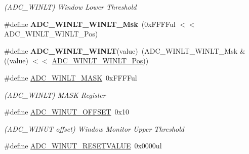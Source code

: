 \begin{DoxyCompactItemize}
\begin{DoxyCompactList}\small\item\em (A\+D\+C\+\_\+\+W\+I\+N\+L\+T) Window Lower Threshold \end{DoxyCompactList}\item 
\hypertarget{group___s_a_m_l21___a_d_c_ga29c9d6e11a88066dbbb16527919a90c1}{}\#define {\bfseries A\+D\+C\+\_\+\+W\+I\+N\+L\+T\+\_\+\+W\+I\+N\+L\+T\+\_\+\+Msk}~(0x\+F\+F\+F\+Ful $<$$<$ A\+D\+C\+\_\+\+W\+I\+N\+L\+T\+\_\+\+W\+I\+N\+L\+T\+\_\+\+Pos)\label{group___s_a_m_l21___a_d_c_ga29c9d6e11a88066dbbb16527919a90c1}

\item 
\hypertarget{group___s_a_m_l21___a_d_c_ga428dbb684b20bfb0502551074b1c7f6e}{}\#define {\bfseries A\+D\+C\+\_\+\+W\+I\+N\+L\+T\+\_\+\+W\+I\+N\+L\+T}(value)~(A\+D\+C\+\_\+\+W\+I\+N\+L\+T\+\_\+\+W\+I\+N\+L\+T\+\_\+\+Msk \& ((value) $<$$<$ \hyperlink{group___s_a_m_l21___a_d_c_ga8d8679254a2a5ba70a7378316be2b2e2}{A\+D\+C\+\_\+\+W\+I\+N\+L\+T\+\_\+\+W\+I\+N\+L\+T\+\_\+\+Pos}))\label{group___s_a_m_l21___a_d_c_ga428dbb684b20bfb0502551074b1c7f6e}

\item 
\hypertarget{group___s_a_m_l21___a_d_c_gabb4377b4ea319484fcd2305d2fe98641}{}\#define \hyperlink{group___s_a_m_l21___a_d_c_gabb4377b4ea319484fcd2305d2fe98641}{A\+D\+C\+\_\+\+W\+I\+N\+L\+T\+\_\+\+M\+A\+S\+K}~0x\+F\+F\+F\+Ful\label{group___s_a_m_l21___a_d_c_gabb4377b4ea319484fcd2305d2fe98641}

\begin{DoxyCompactList}\small\item\em (A\+D\+C\+\_\+\+W\+I\+N\+L\+T) M\+A\+S\+K Register \end{DoxyCompactList}\item 
\hypertarget{group___s_a_m_l21___a_d_c_gacd3f5a80c82eef920b9ebb22f630d852}{}\#define \hyperlink{group___s_a_m_l21___a_d_c_gacd3f5a80c82eef920b9ebb22f630d852}{A\+D\+C\+\_\+\+W\+I\+N\+U\+T\+\_\+\+O\+F\+F\+S\+E\+T}~0x10\label{group___s_a_m_l21___a_d_c_gacd3f5a80c82eef920b9ebb22f630d852}

\begin{DoxyCompactList}\small\item\em (A\+D\+C\+\_\+\+W\+I\+N\+U\+T offset) Window Monitor Upper Threshold \end{DoxyCompactList}\item 
\hypertarget{group___s_a_m_l21___a_d_c_gaf85342ba210b0c7797fceb49e8d7c054}{}\#define \hyperlink{group___s_a_m_l21___a_d_c_gaf85342ba210b0c7797fceb49e8d7c054}{A\+D\+C\+\_\+\+W\+I\+N\+U\+T\+\_\+\+R\+E\+S\+E\+T\+V\+A\+L\+U\+E}~0x0000ul\label{group___s_a_m_l21___a_d_c_gaf85342ba210b0c7797fceb49e8d7c054}


\end{DoxyCompactItemize}

